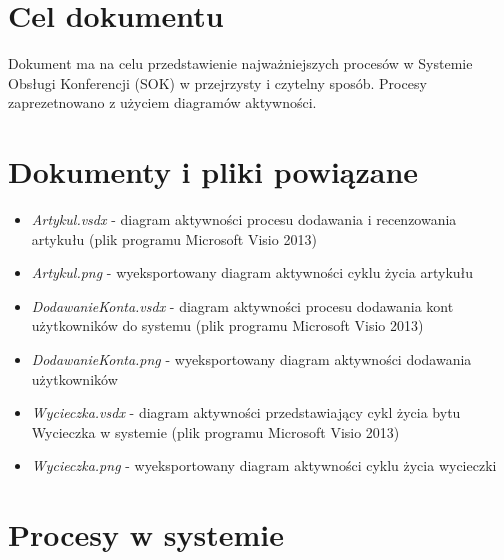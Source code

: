 ﻿\section{Cel dokumentu}
\suppressfloats[t]

Dokument ma na celu przedstawienie najważniejszych procesów w Systemie Obsługi Konferencji (SOK) w przejrzysty i czytelny sposób. Procesy zaprezetnowano z użyciem diagramów aktywności.

\section{Dokumenty i pliki powiązane}

\begin{itemize}
  \item \textit{Artykul.vsdx} - diagram aktywności procesu dodawania i recenzowania artykułu (plik programu Microsoft Visio 2013)
  \item \textit{Artykul.png} - wyeksportowany diagram aktywności cyklu życia artykułu
  \item \textit{DodawanieKonta.vsdx} - diagram aktywności procesu dodawania kont użytkowników do systemu (plik programu Microsoft Visio 2013)
  \item \textit{DodawanieKonta.png} - wyeksportowany diagram aktywności dodawania użytkowników
  \item \textit{Wycieczka.vsdx} - diagram aktywności przedstawiający cykl życia bytu Wycieczka w systemie (plik programu Microsoft Visio 2013)
  \item \textit{Wycieczka.png} - wyeksportowany diagram aktywności cyklu życia wycieczki 
\end{itemize}

\section{Procesy w systemie}

